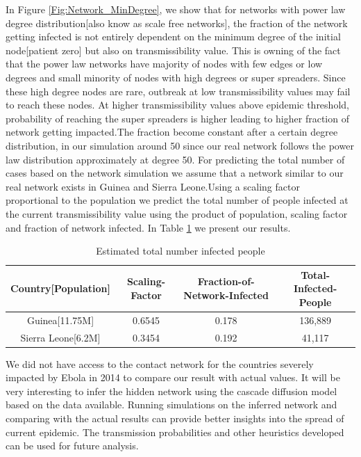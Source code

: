 \documentclass[10pt, journal,onecolumn]{IEEEtran}
\begin{document}
In Figure \ref{Fig:Network_MinDegree}, we show that  for networks with power law degree
distribution[also know as scale free networks], the fraction of the network getting infected is not
entirely dependent on the minimum degree of the  initial node[patient zero] but also on
transmissibility value. This is owning of the fact that the power law networks have majority  of
nodes with few edges or low degrees and small minority of nodes with high degrees or super
spreaders. Since these high degree nodes are rare, outbreak at low transmissibility values  may fail
to reach these nodes. At higher transmissibility values above epidemic threshold, probability of
reaching the super spreaders is higher leading to higher fraction of network getting impacted.The
fraction become constant after a certain degree distribution, in our simulation around 50 since our
real network follows the power law distribution approximately at degree 50. For predicting the total
number of cases based on the network simulation we assume that a  network similar to our real
network exists in Guinea and Sierra Leone.Using a scaling factor proportional to the population we
predict the total number of people infected at the current transmissibility value using the product
of population, scaling factor and fraction of network infected.
In Table \ref{Tb:prediction_networkm} we present our results. \begin{table}[h]
\caption{Estimated total number infected people}
\centering
\begin{tabular}{|c|c|c|c|}
\hline
Country[Population] & Scaling-Factor & Fraction-of-Network-Infected & Total-Infected-People
\tabularnewline
\hline
\hline
Guinea[11.75M] & 0.6545 & 0.178 & 136,889\tabularnewline
\hline
Sierra Leone[6.2M] & 0.3454 & 0.192 & 41,117\tabularnewline
\hline
\end{tabular}
\label{Tb:prediction_networkm}

\end{table}




We did not have access to the  contact network for the countries  severely impacted by Ebola in 2014
to compare our result with actual values.  It will be  very interesting to infer the hidden network
using the cascade diffusion model based on the data available. Running simulations on  the inferred
network and comparing  with the actual results can provide better insights into the spread of
current epidemic. The transmission probabilities and other heuristics developed can be used for
future analysis.
\end{document}
